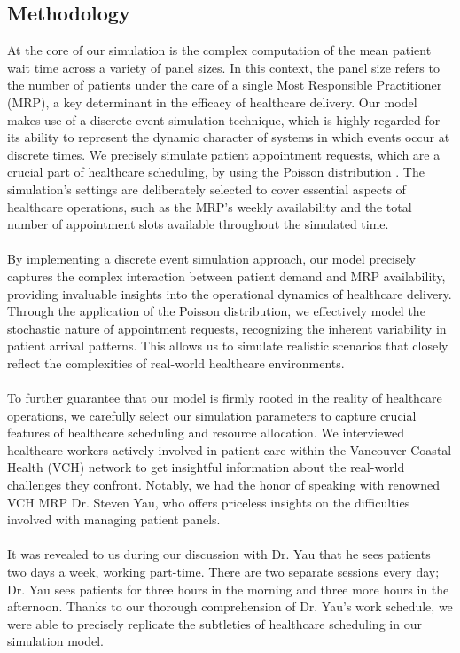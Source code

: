 \documentclass[11pt]{article}
\theoremstyle{definition}
\begin{document}
\subsection*{Methodology}
At the core of our simulation is the complex computation of the mean patient wait time across a variety of panel sizes. In this context, the panel size refers to the number of patients under the care of a single Most Responsible Practitioner (MRP), a key determinant in the efficacy of healthcare delivery. Our model makes use of a discrete event simulation technique, which is highly regarded for its ability to represent the dynamic character of systems in which events occur at discrete times. We precisely simulate patient appointment requests, which are a crucial part of healthcare scheduling, by using the Poisson distribution \cite{Leeftink2021}. The simulation's settings are deliberately selected to cover essential aspects of healthcare operations, such as the MRP's weekly availability and the total number of appointment slots available throughout the simulated time. \\\\
By implementing a discrete event simulation approach, our model precisely captures the complex interaction between patient demand and MRP availability, providing invaluable insights into the operational dynamics of healthcare delivery. Through the application of the Poisson distribution, we effectively model the stochastic nature of appointment requests, recognizing the inherent variability in patient arrival patterns. This allows us to simulate realistic scenarios that closely reflect the complexities of real-world healthcare environments. \\\\
To further guarantee that our model is firmly rooted in the reality of healthcare operations, we carefully select our simulation parameters to capture crucial features of healthcare scheduling and resource allocation. We interviewed healthcare workers actively involved in patient care within the Vancouver Coastal Health (VCH) network to get insightful information about the real-world challenges they confront. Notably, we had the honor of speaking with renowned VCH MRP Dr. Steven Yau, who offers priceless insights on the difficulties involved with managing patient panels. \\\\
It was revealed to us during our discussion with Dr. Yau that he sees patients two days a week, working part-time. There are two separate sessions every day; Dr. Yau sees patients for three hours in the morning and three more hours in the afternoon. Thanks to our thorough comprehension of Dr. Yau's work schedule, we were able to precisely replicate the subtleties of healthcare scheduling in our simulation model.\\\\
\end{document}
